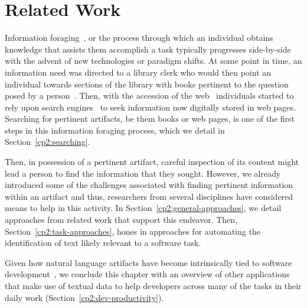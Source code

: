 \setcounter{chapter}{1}


\chapter{Related Work}
\label{ch:related-work}



Information foraging~\cite{Pirolli1999}, or the process through which an individual 
obtains knowledge that assists them accomplish a task
typically progresses side-by-side with the advent of new technologies 
or paradigm shifts. 
At some point in time, 
an information need was directed to a library clerk 
who would then point an individual towards 
sections of the library with books pertinent to the question 
posed by a person~\cite{saracevic1975}.
Then, with the accession of the \acf{web}~\cite{berners1994web}
individuals started to rely upon search engines~\cite{Page1999} 
to seek information now digitally stored in web pages.
Searching for pertinent artifacts, be them books or web pages, 
is one of the first steps in this information foraging process,
which we detail in Section~\ref{cp2:searching}.


Then, in possession of a pertinent artifact, careful 
inspection of its content might lead a person 
to find the information that they sought. 
However, we already introduced some of the challenges
associated with finding pertinent information within 
an artifact and thus, researchers from several 
disciplines have considered means to help 
in this activity. 
In Section~\ref{cp2:general-approaches}, 
we detail approaches from related work
that support this endeavor. 
Then, Section~\ref{cp2:task-approaches}, 
hones in approaches 
for automating the identification of text 
likely relevant to a software task.




Given how 
natural language artifacts have become intrinsically
tied to software development~\cite{umarji2008archetypal},
we conclude this chapter with an overview of 
other applications that make use of textual data
to help developers
across many of the tasks in their daily work (Section~\ref{cp2:dev-productivity}).




